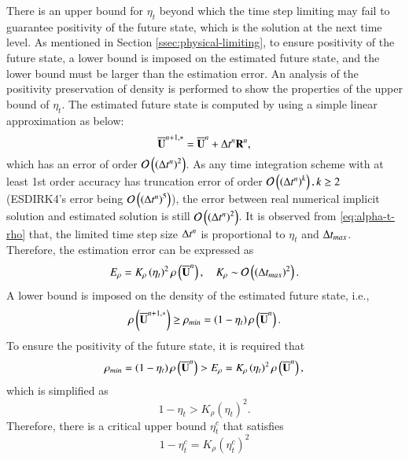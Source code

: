 There is an upper bound for $\eta_t$ beyond which the time step limiting may fail to guarantee positivity of the future state, which is the solution at the next time level. As mentioned in Section \ref{ssec:physical-limiting}, to ensure positivity of the future state, a lower bound is imposed on the estimated future state, and the lower bound must be larger than the estimation error. An analysis of the positivity preservation of density is performed to show the properties of the upper bound of $\eta_t$. The estimated future state is computed by using a simple linear approximation as below:
\begin{equation} 
    \overline{\mathbf{U}}^{n+1,*}=\overline{\mathbf{U}}^n + \mathrm\Delta t^n \mathbf{R}^n,
\end{equation}
which has an error of order $\mathcal{O}\left(\left(\mathrm\Delta t^n\right)^2\right)$.
As any time integration scheme with at least 
1st order accuracy has truncation error 
of order $\mathcal{O}\left(\left(\mathrm\Delta t^n\right)^k\right),k\geq2$
(ESDIRK4's error being $\mathcal{O}\left(\left(\mathrm\Delta t^n\right)^5\right)$),
the error between real numerical implicit solution and estimated
solution is still $\mathcal{O}\left(\left(\mathrm\Delta t^n\right)^2\right)$.
It is observed from \eqref{eq:alpha-t-rho} that, the limited time step size $\mathrm\Delta t^n$ is proportional to $\eta_t$ and $\mathrm\Delta t_{max}$. Therefore, the estimation error can be expressed as
\begin{equation}
    E_\rho= K_\rho \left(\eta_t\right)^2 \rho\left(\overline{\mathbf{U}}^n\right) , \quad K_\rho \sim \mathcal{O}\left(\left(\mathrm\Delta t_{max}\right)^2\right).
\end{equation}
A lower bound is imposed on the density of the estimated future state, i.e.,
\begin{equation}
    \rho\left(\overline{\mathbf{U}}^{n+1,*}\right) \geq \rho_{min}= \left(1-\eta_t\right) \rho\left(\overline{\mathbf{U}}^n\right).
\end{equation}
To ensure the positivity of the future state, it is required that
\begin{equation}
    \rho_{min}= \left(1-\eta_t\right) \rho\left(\overline{\mathbf{U}}^n\right) > E_\rho= K_\rho \left(\eta_t\right)^2 \rho\left(\overline{\mathbf{U}}^n\right),
\end{equation}
which is simplified as 
\begin{equation}
    1-\eta_t > K_\rho \left(\eta_t\right)^2.
\end{equation}
Therefore, there is a critical upper bound $\eta^c_t$ that satisfies 
\begin{equation}
    1-\eta^c_t = K_\rho \left(\eta^c_t\right)^2
\end{equation}
